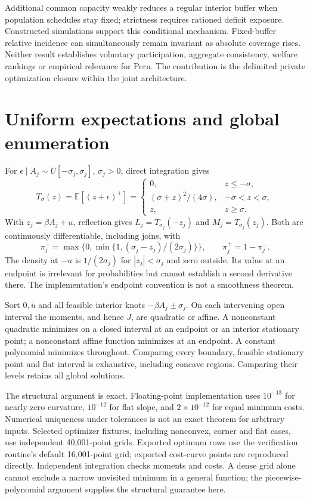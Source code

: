 \documentclass[11pt]{article}
\theoremstyle{definition}
\newcommand{\E}{\mathbb E}
\begin{document}
Additional common capacity weakly reduces a regular interior buffer when population schedules stay fixed; strictness requires rationed deficit exposure. Constructed simulations support this conditional mechanism. Fixed-buffer relative incidence can simultaneously remain invariant as absolute coverage rises. Neither result establishes voluntary participation, aggregate consistency, welfare rankings or empirical relevance for Peru. The contribution is the delimited private optimization closure within the joint architecture.
\label{end:body}
\clearpage


\clearpage
\appendix

\section{Uniform expectations and global enumeration}\label{app:uniform}
For $\epsilon\mid A_j\sim U[-\sigma_j,\sigma_j]$, $\sigma_j>0$, direct integration gives
\[
 T_\sigma(z)=\E[(z+\epsilon)^+]=
 \begin{cases}0,&z\leq-\sigma,\\
 (\sigma+z)^2/(4\sigma),&-\sigma<z<\sigma,\\z,&z\geq\sigma.\end{cases}
\]
With $z_j=\beta A_j+u$, reflection gives $L_j=T_{\sigma_j}(-z_j)$ and $M_j=T_{\sigma_j}(z_j)$. Both are continuously differentiable, including joins, with
\[
 \pi^-_j=\max\{0,\min\{1,(\sigma_j-z_j)/(2\sigma_j)\}\},\qquad \pi^+_j=1-\pi^-_j.
\]
The density at $-u$ is $1/(2\sigma_j)$ for $|z_j|<\sigma_j$ and zero outside. Its value at an endpoint is irrelevant for probabilities but cannot establish a second derivative there. The implementation's endpoint convention is not a smoothness theorem.

Sort $0,\bar u$ and all feasible interior knots $-\beta A_j\pm\sigma_j$. On each intervening open interval the moments, and hence $J$, are quadratic or affine. A nonconstant quadratic minimizes on a closed interval at an endpoint or an interior stationary point; a nonconstant affine function minimizes at an endpoint. A constant polynomial minimizes throughout. Comparing every boundary, feasible stationary point and flat interval is exhaustive, including concave regions. Comparing their levels retains all global solutions.

The structural argument is exact. Floating-point implementation uses $10^{-13}$ for nearly zero curvature, $10^{-12}$ for flat slope, and $2\times10^{-12}$ for equal minimum costs. Numerical uniqueness under tolerances is not an exact theorem for arbitrary inputs. Selected optimizer fixtures, including nonconvex, corner and flat cases, use independent 40,001-point grids. Exported optimum rows use the verification routine's default 16,001-point grid; exported cost-curve points are reproduced directly. Independent integration checks moments and costs. A dense grid alone cannot exclude a narrow unvisited minimum in a general function; the piecewise-polynomial argument supplies the structural guarantee here.
\end{document}
